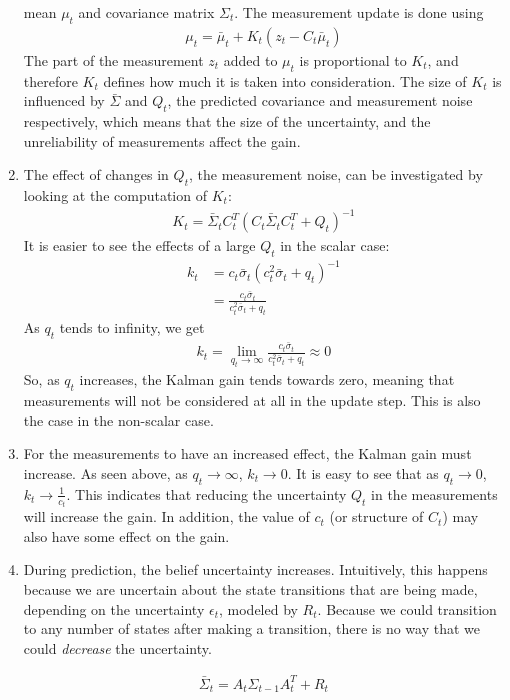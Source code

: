 \documentclass[a4paper,12pt]{article}
\begin{document}
\begin{enumerate}
  mean $\mu_t$ and covariance matrix $\Sigma_t$. The measurement update is done
  using
  \begin{align*}
    \mu_t=\bar{\mu}_t+K_t(z_t-C_t\bar{\mu}_t)
  \end{align*}
  The part of the measurement $z_t$ added to $\mu_t$ is proportional to $K_t$,
  and therefore $K_t$ defines how much it is taken into consideration. The size
  of $K_t$ is influenced by $\bar{\Sigma}$ and $Q_t$, the predicted covariance
  and measurement noise respectively, which means that the size of the
  uncertainty, and the unreliability of measurements affect the gain.
\item The effect of changes in $Q_t$, the measurement noise, can be investigated
  by looking at the computation of $K_t$:
  \begin{align*}
    K_t=\bar{\Sigma}_tC^T_t(C_t\bar{\Sigma}_tC^T_t+Q_t)^{-1}
  \end{align*}
It is easier to see the effects of a large $Q_t$ in the scalar case:
\begin{align*}
  k_t&=c_t\bar{\sigma}_t(c^2_t\bar{\sigma}_t+q_t)^{-1}\\
  &=\frac{c_t\bar{\sigma}_t}{c^2_t\bar{\sigma}_t+q_t}
\end{align*}
As $q_t$ tends to infinity, we get
\begin{align*}
  k_t=\lim_{q_t\to \infty}\frac{c_t\bar{\sigma}_t}{c^2_t\bar{\sigma}_t+q_t} \approx 0
\end{align*}
So, as $q_t$ increases, the Kalman gain tends towards zero, meaning that
measurements will not be considered at all in the update step. This is also the
case in the non-scalar case.
\item For the measurements to have an increased effect, the Kalman gain must
  increase. As seen above, as $q_t\to \infty$, $k_t\to 0$. It is easy to see
  that as $q_t \to 0$, $k_t\to \frac{1}{c_t}$. This indicates that reducing the
  uncertainty $Q_t$ in the measurements will increase the gain. In addition,
  the value of $c_t$ (or structure of $C_t$) may also have some effect on the
  gain.
\item During prediction, the belief uncertainty increases. Intuitively, this
  happens because we are uncertain about the state transitions that are being
  made, depending on the uncertainty $\epsilon_t$, modeled by $R_t$. Because we
  could transition to any number of states after making a transition, there is
  no way that we could \emph{decrease} the uncertainty.
  
  \begin{align*}
    \bar{\Sigma}_t=A_t\Sigma_{t-1}A^T_t+R_t
  \end{align*}


\end{enumerate}
\end{document}

